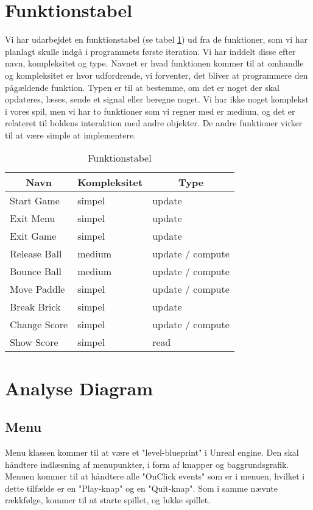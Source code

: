 \section{Funktionstabel}
Vi har udarbejdet en funktionstabel (se  tabel \ref{funktionstabel}) ud fra de funktioner, som vi har planlagt skulle indgå i programmets første iteration. Vi har inddelt disse efter navn, kompleksitet og type. Navnet er hvad funktionen kommer til at omhandle og kompleksitet er hvor udfordrende, vi forventer, det bliver at programmere den pågældende funktion. Typen er til at bestemme, om det er noget der skal opdateres, læses, sende et signal eller beregne noget. Vi har ikke noget komplekst i vores spil, men vi har to funktioner som vi regner med er medium, og det er relateret til boldens interaktion med andre objekter. De andre funktioner virker til at være simple at implementere.
\begin{table}[]
\centering
\caption{Funktionstabel}
\label{funktionstabel}
\begin{tabular}{|l|l|l|}
\hline
\multicolumn{1}{|c|}{Navn} & \multicolumn{1}{c|}{Kompleksitet} & \multicolumn{1}{c|}{Type} \\ \hline
Start Game & simpel & update \\ \hline
Exit Menu & simpel & update \\ \hline
Exit Game & simpel & update \\ \hline
Release Ball & medium & update / compute \\ \hline
Bounce Ball & medium & update / compute \\ \hline
Move Paddle & simpel & update / compute \\ \hline
Break Brick & simpel & update \\ \hline
Change Score & simpel & update / compute \\ \hline
Show Score & simpel & read \\ \hline
\end{tabular}
\end{table}

\section{Analyse Diagram}

\subsection{Menu}
Menu klassen kommer til at være et "level-blueprint" i Unreal engine. Den skal håndtere indlæsning af menupunkter, i form af
knapper og baggrundsgrafik. Menuen kommer til at håndtere alle "OnClick events" som er i menuen, hvilket i dette tilfælde er en
"Play-knap" og en "Quit-knap". Som i samme nævnte rækkfølge, kommer til at starte spillet, og lukke spillet.

